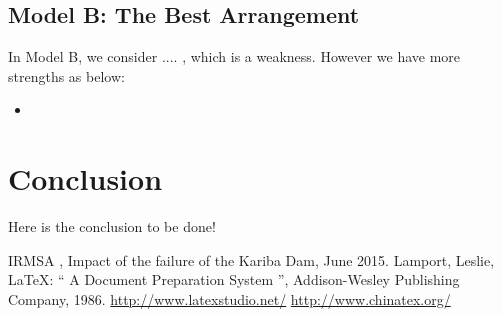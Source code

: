\documentclass{mcmthesis}
\begin{document}
\subsection{Model B: The Best Arrangement}
In Model B, we consider .... , which is a weakness. However we have more strengths as below:
\begin{itemize}
  \item 
\end{itemize}

\section{Conclusion}
\indent \indent Here is the conclusion to be done!

\begin{thebibliography}{99}
 IRMSA , Impact of the failure of the Kariba Dam, June 2015.
Lamport, Leslie,  \LaTeX{}: `` A Document Preparation System '',
Addison-Wesley Publishing Company, 1986.
\url{http://www.latexstudio.net/}
\url{http://www.chinatex.org/}
\end{thebibliography}

\clearpage
\end{document}

